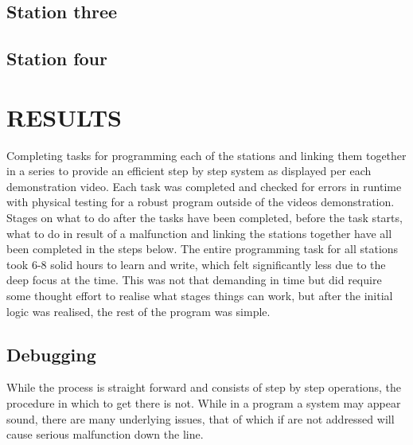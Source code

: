 \documentclass[a4paper, 10pt,  conference]{article}
\begin{document}

\subsection{Station three}





\subsection{Station four}







\section{RESULTS}
Completing tasks for programming each of the stations and linking them together in a series to provide an efficient step by step system as displayed per each demonstration video. Each task was completed and checked for errors in runtime with physical testing for a robust program outside of the videos demonstration. Stages on what to do after  the tasks have been completed, before the task starts, what to do in result of a malfunction and linking the stations together have all been completed in the steps below. The entire programming task for all stations took 6-8 solid hours to learn and write, which felt significantly less due to the deep focus at the time. This was not that demanding in time but did require some thought effort to realise what stages things can work, but after the initial logic was realised, the rest of the program was simple.



\subsection{Debugging} 
While the process is straight forward and consists of step by step operations, the procedure in which to get there is not. While in a program a system may appear sound, there are many underlying issues, that of which if are not addressed will cause serious malfunction down the line. 
\end{document}
